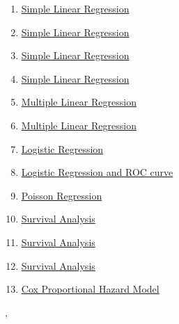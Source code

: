 \documentclass[11pt]{article}
\renewcommand{\today}{\shortmonthname[\the\month] \the \day,  \the\year}
\begin{document}
\begin{multicols}{2}
	\begin{enumerate}
		\item \href{https://mp.weixin.qq.com/s/Wzsprh20B17fzY1msStCYQ}{Simple Linear Regression}	%
		\item \href{https://mp.weixin.qq.com/s/KX1tPnz9148McLb3ZfcgAQ}{Simple Linear Regression}	%
		\item \href{https://mp.weixin.qq.com/s/Ax-EtdoPvCap9euJyTJmuQ}{Simple Linear Regression}	%
		\item \href{https://mp.weixin.qq.com/s/7qHvtNKwMi2DsFHMpLGglg}{Simple Linear Regression}	%
		\item \href{https://mp.weixin.qq.com/s/CoB_qBXeJtUQ6xipFMsFLw}{Multiple Linear Regression}	%
		\item \href{https://mp.weixin.qq.com/s/YFdgWBb0QV4VSiAiwQ8KaA}{Multiple Linear Regression}	%
		\item \href{https://mp.weixin.qq.com/s/uvdDE1gtEp4lVx4J9lDuCA}{Logistic Regression}	%
		\item \href{https://mp.weixin.qq.com/s/yycWVyIh3ZCcBlM9Ak0Jcw}{Logistic Regression and ROC curve}	%
		\item \href{https://mp.weixin.qq.com/s/OvZYIUBmKJdjtrtNUC69wQ}{Poisson Regression}	%
		\item \href{https://mp.weixin.qq.com/s/P5SNGFStW_Rrd9VI74TJ2g}{Survival Analysis}	%
		\item \href{https://mp.weixin.qq.com/s/vUqCX6dF-hfxfb3ACN8HmQ}{Survival Analysis}	%
		\item \href{https://mp.weixin.qq.com/s/_N6vKJ9iow_RudH4pSzqgQ}{Survival Analysis}	%
		\item \href{https://mp.weixin.qq.com/s/3YeBrXENUrwHcV-m3gUvyw}{Cox Proportional Hazard Model}	%
	\end{enumerate}
\end{multicols}




%
\begin{flushright}
	\tiny \today 
\end{flushright}
\end{document}
